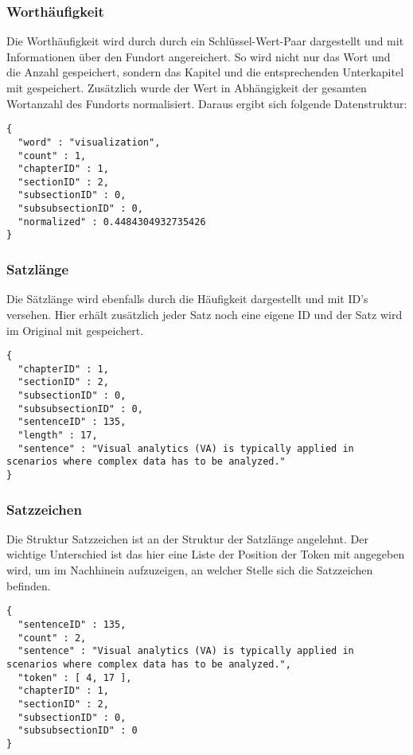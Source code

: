 \subsubsection*{Worth\"aufigkeit}
Die Worth\"aufigkeit wird durch durch ein Schl\"ussel-Wert-Paar dargestellt und mit Informationen \"uber den Fundort angereichert. So wird nicht nur das Wort und die Anzahl gespeichert, sondern das Kapitel und die entsprechenden Unterkapitel mit gespeichert. Zus\"atzlich wurde der Wert in Abhängigkeit der gesamten Wortanzahl des Fundorts normalisiert. Daraus ergibt sich folgende Datenstruktur:\\
\begin{lstlisting}
{
  "word" : "visualization",
  "count" : 1,
  "chapterID" : 1,
  "sectionID" : 2,
  "subsectionID" : 0,
  "subsubsectionID" : 0,
  "normalized" : 0.4484304932735426
}
\end{lstlisting}

\subsubsection*{Satzl\"ange}
Die S\"atzl\"ange wird ebenfalls durch die H\"aufigkeit dargestellt und mit ID's versehen. Hier erh\"alt zus\"atzlich jeder Satz noch eine eigene ID und der Satz wird im Original mit gespeichert.
\begin{lstlisting}
{
  "chapterID" : 1,
  "sectionID" : 2,
  "subsectionID" : 0,
  "subsubsectionID" : 0,
  "sentenceID" : 135,
  "length" : 17,
  "sentence" : "Visual analytics (VA) is typically applied in scenarios where complex data has to be analyzed."
}
\end{lstlisting}

\subsubsection*{Satzzeichen}
Die Struktur Satzzeichen ist an der Struktur der Satzl\"ange angelehnt. Der wichtige Unterschied ist das hier eine Liste der Position der Token mit angegeben wird, um im Nachhinein aufzuzeigen, an welcher Stelle sich die Satzzeichen befinden.
\begin{lstlisting}
{
  "sentenceID" : 135,
  "count" : 2,
  "sentence" : "Visual analytics (VA) is typically applied in scenarios where complex data has to be analyzed.",
  "token" : [ 4, 17 ],
  "chapterID" : 1,
  "sectionID" : 2,
  "subsectionID" : 0,
  "subsubsectionID" : 0
}
\end{lstlisting}

